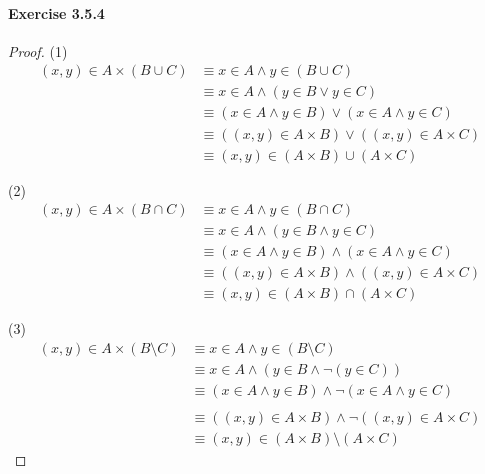 \paragraph{Exercise 3.5.4} \label{exercise3.5.4}
\begin{proof}
(1)
\begin{align*}
(x,y) \in A \times (B \cup C) &\equiv x \in A \wedge y \in (B \cup C) \\
&\equiv x \in A \wedge (y \in B \vee y \in C) \\
&\equiv (x \in A \wedge y \in B) \vee (x \in A \wedge y \in C) \\
&\equiv ((x,y) \in A \times B) \vee ((x,y) \in A \times C) \\
&\equiv (x,y) \in (A \times B) \cup (A \times C)
\end{align*}

(2)
\begin{align*}
(x,y) \in A \times (B \cap C) &\equiv x \in A \wedge y \in (B \cap C) \\
&\equiv x \in A \wedge (y \in B \wedge y \in C) \\
&\equiv (x \in A \wedge y \in B) \wedge (x \in A \wedge y \in C) \\
&\equiv ((x,y) \in A \times B) \wedge ((x,y) \in A \times C) \\
&\equiv (x,y) \in (A \times B) \cap (A \times C)
\end{align*}

(3)
\begin{align*}
(x,y) \in A \times (B \setminus C) &\equiv x \in A \wedge y \in (B \setminus C) \\
&\equiv x \in A \wedge (y \in B \wedge \neg (y \in C)) \\
&\equiv (x \in A \wedge y \in B) \wedge \neg (x \in A \wedge y \in C) \\
\tag{The statement $x \in A$ implies $\neg (x \in A \wedge y \in C) 
\Longrightarrow \neg (y \in C)$}\\
&\equiv ((x,y) \in A \times B) \wedge \neg((x,y) \in A \times C) \\
&\equiv (x,y) \in (A \times B) \setminus (A \times C)
\end{align*}
\end{proof}


